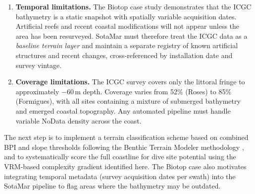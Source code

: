 \documentclass[a4paper,11pt]{article}
\begin{document}
\begin{enumerate}
\item \textbf{Temporal limitations.} The Biotop case study demonstrates that the ICGC
    bathymetry is a static snapshot with spatially variable acquisition dates. Artificial
    reefs and recent coastal modifications will not appear unless the area has been
    resurveyed. SotaMar must therefore treat the ICGC data as a \emph{baseline terrain
    layer} and maintain a separate registry of known artificial structures and recent
    changes, cross-referenced by installation date and survey vintage.

\item \textbf{Coverage limitations.} The ICGC survey covers only the littoral fringe to
    approximately $-$60\,m depth. Coverage varies from 52\% (Roses) to 85\% (Formigues),
    with all sites containing a mixture of submerged bathymetry and emerged coastal
    topography. Any automated pipeline must handle variable NoData density across the
    coast.
\end{enumerate}

The next step is to implement a terrain classification scheme based on combined BPI and
slope thresholds following the Benthic Terrain Modeler methodology
\citep{lundblad2006}, and to systematically score the full coastline for dive site
potential using the VRM-based complexity gradient identified here. The Biotop case also
motivates integrating temporal metadata (survey acquisition dates per swath) into the
SotaMar pipeline to flag areas where the bathymetry may be outdated.

\end{document}
